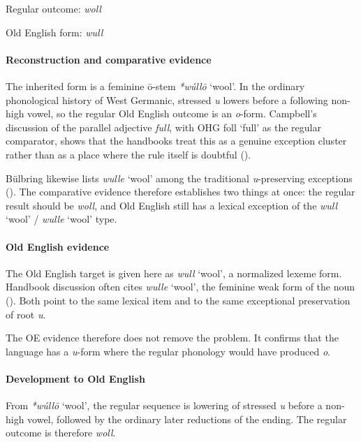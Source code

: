 \documentclass[
  british,
  a4paper,
]{article}
\providecommand{\Recon}[1]{\emph{*#1}}
\begin{document}
Regular outcome: \emph{woll}

Old English form: \emph{wull}

\paragraph{Reconstruction and comparative
evidence}\label{reconstruction-and-comparative-evidence-153}

The inherited form is a feminine ō-stem \Recon{wúllō} `wool'. In the
ordinary phonological history of West Germanic, stressed \emph{u} lowers
before a following non-high vowel, so the regular Old English outcome is
an \emph{o}-form. Campbell's discussion of the parallel adjective
\emph{full}, with OHG {foll} `full' as the regular comparator, shows
that the handbooks treat this as a genuine exception cluster rather than
as a place where the rule itself is doubtful
().

Bülbring likewise lists {\emph{wulle}} `wool' among the traditional
\emph{u}-preserving exceptions (). The comparative evidence therefore establishes two
things at once: the regular result should be \emph{woll}, and Old
English still has a lexical exception of the {\emph{wull}} `wool' /
{\emph{wulle}} `wool' type.

\paragraph{Old English evidence}\label{old-english-evidence-153}

The Old English target is given here as {\emph{wull}} `wool', a
normalized lexeme form. Handbook discussion often cites {\emph{wulle}}
`wool', the feminine weak form of the noun
(). Both point to
the same lexical item and to the same exceptional preservation of root
\emph{u}.

The OE evidence therefore does not remove the problem. It confirms that
the language has a \emph{u}-form where the regular phonology would have
produced \emph{o}.

\paragraph{Development to Old
English}\label{development-to-old-english-153}

From \Recon{wúllō} `wool', the regular sequence is lowering of stressed
\emph{u} before a non-high vowel, followed by the ordinary later
reductions of the ending. The regular outcome is therefore \emph{woll}.
\end{document}
